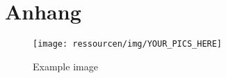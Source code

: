 \appendix
\chapter{Anhang}
\begin{figure}[H]
    \centering
    \texttt{[image: ressourcen/img/YOUR\_PICS\_HERE]}
    \caption{Example image}
    \label{fig:example-image}
\end{figure}